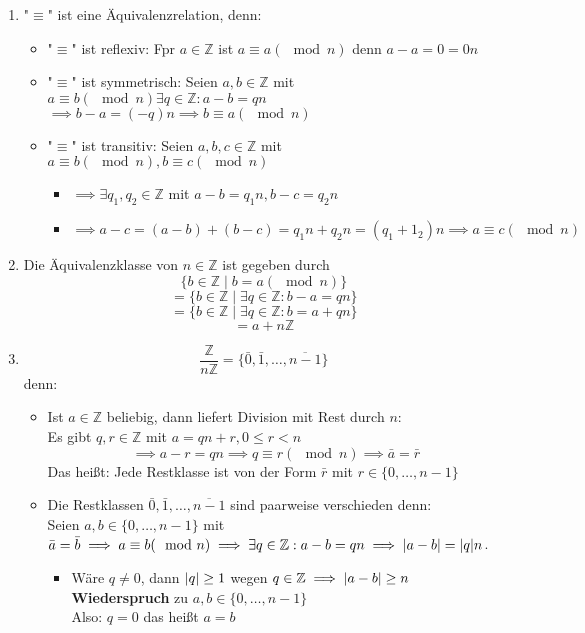 \documentclass[a4paper]{scrartcl}
\DeclarePairedDelimiter\abs{\lvert}{\rvert}%
\theoremstyle{definition}
\theoremstyle{plain}
\theoremstyle{plain}
\theoremstyle{remark}
\theoremstyle{remark}
\theoremstyle{remark}
\theoremstyle{remark}
\theoremstyle{remark}
\begin{document}
\begin{enumerate}
\item "$\equiv$" ist eine Äquivalenzrelation, denn:
\begin{itemize}
\item "$\equiv$" ist reflexiv: Fpr $a\in\mathbb{Z}$ ist $a\equiv a(\mod n)$ denn $a - a = 0 = 0 n$
\item "$\equiv$" ist symmetrisch: Seien $a,b\in\mathbb{Z}$ mit $a\equiv b(\mod n) \exists q\in\mathbb{Z}:a - b = q n$ \\
           $\implies b - a = (-q) n \implies b \equiv a(\mod n)$
\item "$\equiv$" ist transitiv: Seien $a,b,c\in\mathbb{Z}$ mit $a\equiv b(\mod n), b\equiv c(\mod n)$
\begin{itemize}
\item $\implies \exists q_1,q_2 \in\mathbb{Z}$ mit $a - b = q_1 n, b - c = q_2 n$
\item $\implies a - c = (a - b) + (b - c) = q_1 n + q_2 n = (q_1 + 1_2) n \implies a \equiv c(\mod n)$
\end{itemize}
\end{itemize}
\item Die Äquivalenzklasse von $n\in\mathbb{Z}$ ist gegeben durch
\[\{b\in\mathbb{Z} \mid b = a(\mod n)\}\]
\[= \{b\in\mathbb{Z} \mid \exists q\in\mathbb{Z}:b - a = qn\}\]
\[= \{b\in\mathbb{Z} \mid \exists q\in\mathbb{Z}:b = a + q n\}\]
\[= a + n\mathbb{Z} \]
\item \[\frac{\mathbb{Z}}{n\mathbb{Z}} = \{\bar 0, \bar 1, \ldots, \overline{n - 1}\}\]
         denn:
\begin{itemize}
\item Ist $a\in\mathbb{Z}$ beliebig, dann liefert Division mit Rest durch $n$: \\
           Es gibt $q,r\in\mathbb{Z}$ mit $a = q n + r,0\leq r < n$
           \[\implies a - r = q n \implies q \equiv r(\mod n) \implies \bar a = \bar r\]
           Das heißt: Jede Restklasse ist von der Form $\bar r$ mit $r\in \{0,\ldots,n - 1\}$ \\
\item Die Restklassen $\bar 0, \bar 1, \ldots, \overline{n - 1}$ sind paarweise verschieden denn: \\
           Seien $a,b\in\{0,\ldots,n - 1\}$ mit $\bar a = \bar b \implies a \equiv b(\mod n) \implies \exists q\in \mathbb{Z}: a - b = q n \implies \abs{a - b} = \abs{q} n$.
\begin{itemize}
\item Wäre $q\neq 0$, dann $\abs{q} \geq 1$ wegen $q\in\mathbb{Z} \implies \abs{a - b} \geq n$ \textbf{Wiederspruch} zu $a,b\in\{0,\ldots,n - 1\}$ \\
             Also: $q = 0$ das heißt $a = b$
\end{itemize}
\end{itemize}
\end{enumerate}
\end{document}
